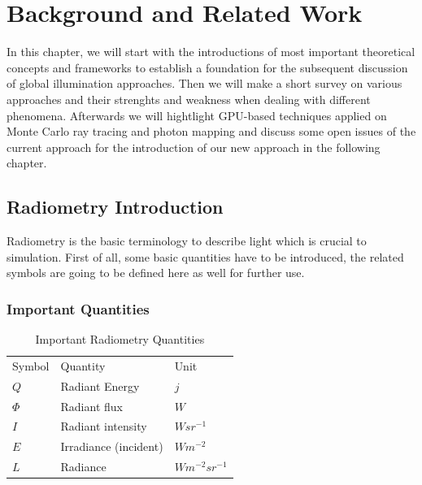 \chapter{Background and Related Work}

In this chapter, we will start with the introductions of most important theoretical concepts and frameworks to establish a foundation for the subsequent discussion of global illumination approaches. Then we will make a short survey on various approaches and their strenghts and weakness when dealing with different phenomena. Afterwards we will hightlight GPU-based techniques applied on Monte Carlo ray tracing and photon mapping and discuss some open issues of the current approach for the introduction of our new approach in the following chapter. 



\section{Radiometry Introduction}
Radiometry is the basic terminology to describe light which is crucial to simulation. First of all, some basic quantities have to be introduced, the related symbols are going to be defined here as well for further use.

\subsection{Important Quantities} 

\begin{table}[ht]
\begin{center}
	
	\renewcommand{\arraystretch}{1.2}
	\begin{tabular}{ | l | l | l |}     	
	\hline 

	Symbol & Quantity & Unit \\
	\cline{1-3}

	\(Q\) 			& 		Radiant Energy 				& 		\(j\) \\ 
	\(\Phi\) 			& 		Radiant flux 					& 		\(W\) \\ 
	\(I\) 			& 		Radiant intensity 				& 		\(W sr^{-1}\) \\
	\(E\)			&		Irradiance (incident) 			&		\(W m^{-2}\) \\  
	\(L\)			&		Radiance						&		\(W m^{-2} sr^{-1}\) \\ 
	
	\hline

	\end{tabular}
\end{center} 
\caption{Important Radiometry Quantities}
\label{tab:radiometry_quantities}
\end{table}

